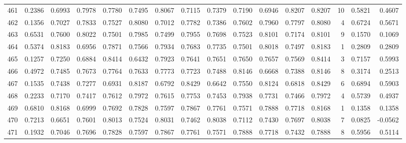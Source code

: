 \begin{tabular}{lrrrrrrrrrrrrrrr}
461 &      0.2386 &  0.6993 &  0.7978 &  0.7780 &  0.7495 &  0.8067 &  0.7115 &  0.7379 &  0.7190 &  0.6946 &   0.8207 &     0.8207 &     10 &                    0.5821 &                     0.4607 \\
462 &      0.1356 &  0.7027 &  0.7833 &  0.7527 &  0.8080 &  0.7012 &  0.7782 &  0.7386 &  0.7602 &  0.7960 &   0.7797 &     0.8080 &      4 &                    0.6724 &                     0.5671 \\
463 &      0.6531 &  0.7600 &  0.8022 &  0.7501 &  0.7985 &  0.7499 &  0.7955 &  0.7698 &  0.7523 &  0.8101 &   0.7174 &     0.8101 &      9 &                    0.1570 &                     0.1069 \\
464 &      0.5374 &  0.8183 &  0.6956 &  0.7871 &  0.7566 &  0.7934 &  0.7683 &  0.7735 &  0.7501 &  0.8018 &   0.7497 &     0.8183 &      1 &                    0.2809 &                     0.2809 \\
465 &      0.1257 &  0.7250 &  0.6884 &  0.8414 &  0.6432 &  0.7923 &  0.7641 &  0.7651 &  0.7650 &  0.7657 &   0.7569 &     0.8414 &      3 &                    0.7157 &                     0.5993 \\
466 &      0.4972 &  0.7485 &  0.7673 &  0.7764 &  0.7633 &  0.7773 &  0.7723 &  0.7488 &  0.8146 &  0.6668 &   0.7388 &     0.8146 &      8 &                    0.3174 &                     0.2513 \\
467 &      0.1535 &  0.7438 &  0.7277 &  0.6931 &  0.8187 &  0.6792 &  0.8429 &  0.6642 &  0.7550 &  0.8124 &   0.6818 &     0.8429 &      6 &                    0.6894 &                     0.5903 \\
468 &      0.2233 &  0.7170 &  0.7417 &  0.7612 &  0.7972 &  0.7615 &  0.7753 &  0.7453 &  0.7938 &  0.7731 &   0.7466 &     0.7972 &      4 &                    0.5739 &                     0.4937 \\
469 &      0.6810 &  0.8168 &  0.6999 &  0.7692 &  0.7828 &  0.7597 &  0.7867 &  0.7761 &  0.7571 &  0.7888 &   0.7718 &     0.8168 &      1 &                    0.1358 &                     0.1358 \\
470 &      0.7213 &  0.6651 &  0.7601 &  0.8013 &  0.7524 &  0.8031 &  0.7462 &  0.8038 &  0.7112 &  0.7430 &   0.7697 &     0.8038 &      7 &                    0.0825 &                    -0.0562 \\
471 &      0.1932 &  0.7046 &  0.7696 &  0.7828 &  0.7597 &  0.7867 &  0.7761 &  0.7571 &  0.7888 &  0.7718 &   0.7432 &     0.7888 &      8 &                    0.5956 &                     0.5114 \\

\end{tabular}
